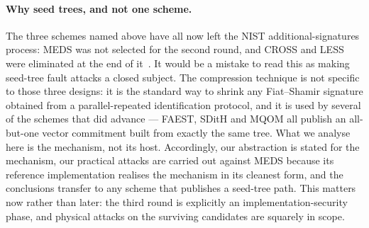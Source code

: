 \paragraph{Why seed trees, and not one scheme.}
The three schemes named above have all now left the NIST additional-signatures
process: MEDS was not selected for the second round, and CROSS and LESS were
eliminated at the end of it~\cite{NISTIR8610}. It would be a mistake to read
this as making seed-tree fault attacks a closed subject. The compression
technique is not specific to those three designs: it is the standard way to
shrink any Fiat--Shamir signature obtained from a parallel-repeated
identification protocol, and it is used by several of the schemes that did
advance --- FAEST, SDitH and MQOM all publish an all-but-one vector commitment
built from exactly the same tree. What we analyse here is the mechanism, not
its host. Accordingly, our abstraction is stated for the mechanism, our
practical attacks are carried out against MEDS because its reference
implementation realises the mechanism in its cleanest form, and the
conclusions transfer to any scheme that publishes a seed-tree path. This
matters now rather than later: the third round is explicitly an
implementation-security phase, and physical attacks on the surviving
candidates are squarely in scope.

